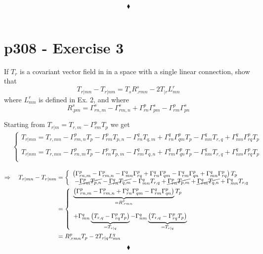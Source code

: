 $$\blacklozenge$$\\
\newpage


\section{p308 - Exercise 3}
\begin{tcolorbox}
If $T_r$ is a covariant vector field in in a space with a single linear connection, show that
 $$ T_{r|mn} - T_{r|nm} = T_s R^s_{.rmn}-2 T_{|r} L^r_{mn}$$
 where $ L^r_{mn}$ is defined in Ex. $2$, and where 
 $$R^s_{.pm} = \Gamma^s_{rn,m} - \Gamma^s_{rm,n} + \Gamma^p_{rn}\Gamma^s_{pm}-\Gamma^p_{rm}\Gamma^s_{pn}$$
\end{tcolorbox}
Starting from $ T_{r|m} = T_{r,m} - \Gamma^p_{rm}T_p$ we get
\begin{align*}
&\left\{\begin{array}{l}
T_{r|mn} = T_{r,mn} - \Gamma^p_{rm,n}T_p- \Gamma^p_{rm}T_{p,n} - \Gamma^q_{rn}T_{q,m} + \Gamma^q_{rn}\Gamma^p_{qm}T_{p} - \Gamma^q_{mn}T_{r,q} +  \Gamma^q_{mn}\Gamma^p_{rq}T_{p} \\\\
T_{r|nm} = T_{r,mn} - \Gamma^p_{rn,m}T_p- \Gamma^p_{rn}T_{p,m} - \Gamma^q_{rm}T_{q,n} + \Gamma^q_{rm}\Gamma^p_{qn}T_{p} - \Gamma^q_{nm}T_{r,q} +  \Gamma^q_{nm}\Gamma^p_{rq}T_{p} \\
\end{array}
\right.
\end{align*}

\begin{align*}
\Rightarrow\quad T_{r|mn} -T_{r|nm} &= \left\{\begin{array}{l}
 \left(\Gamma^p_{rn,m} - \Gamma^p_{rm,n} 
- \Gamma^q_{mn}\Gamma^p_{rq}+ \Gamma^q_{rn}\Gamma^p_{qm}- \Gamma^q_{rm}\Gamma^p_{qn}+  \Gamma^q_{mn}\Gamma^p_{rq}\right)T_p\\\
- \cancel{\Gamma^p_{rm}T_{p,n}} - \cancel{\Gamma^q_{rn}T_{q,m}}  - \Gamma^q_{mn}T_{r,q}   +  \cancel{\Gamma^p_{rn}T_{p,m}} + \cancel{\Gamma^q_{rm}T_{q,n}} + \Gamma^q_{mn}T_{r,q}  \\
\end{array}
\right.\\
&=  \left\{\begin{array}{l}
 \underbrace{\left(\Gamma^p_{rn,m} - \Gamma^p_{rm,n} 
+ \Gamma^q_{rn}\Gamma^p_{qm}- \Gamma^q_{rm}\Gamma^p_{qn}\right)}_{= R^p_{.rmn}}T_p\\\\
 +  \Gamma^q_{mn}\underbrace{\left(T_{r,q}- \Gamma^p_{rq}T_p\right)}_{= T_{r|q}} -  \Gamma^q_{nm}\underbrace{\left(T_{r,q}-\Gamma^p_{rq}T_p\right)}_{= T_{r|q}}
   \\
\end{array}
\right.\\
&= R^p_{.rmn}T_p-2T_{r|q}L^q_{mn}
\end{align*}
$$\blacklozenge$$\\
\newpage



